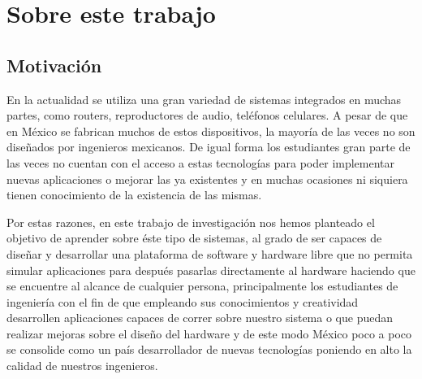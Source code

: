 \chapter{Sobre este trabajo}\label{ch:about}
\section{Motivaci\'on}\label{sec:motivation}

En la actualidad se utiliza una gran variedad de sistemas integrados
en muchas partes, como routers, reproductores de audio, teléfonos
celulares. A pesar de que en México se fabrican muchos de estos
dispositivos, la mayoría de las veces no son diseñados por ingenieros
mexicanos. De igual forma los estudiantes gran parte de las veces
no cuentan con el acceso a estas tecnologías para poder implementar
nuevas aplicaciones o mejorar las ya existentes y en muchas ocasiones
ni siquiera tienen conocimiento de la existencia de las mismas.

Por estas razones, en este trabajo de investigación nos hemos planteado
el objetivo de aprender sobre éste tipo de sistemas, al grado de ser
capaces de diseñar y desarrollar una plataforma de software y hardware
libre que no permita simular aplicaciones para después pasarlas directamente
al hardware haciendo que se encuentre al alcance de cualquier persona,
principalmente los estudiantes de ingeniería con el fin de que empleando
sus conocimientos y creatividad desarrollen aplicaciones capaces de
correr sobre nuestro sistema o que puedan realizar mejoras sobre el
diseño del hardware y de este modo México poco a poco se consolide
como un país desarrollador de nuevas tecnologías poniendo en alto la
calidad de nuestros ingenieros.

